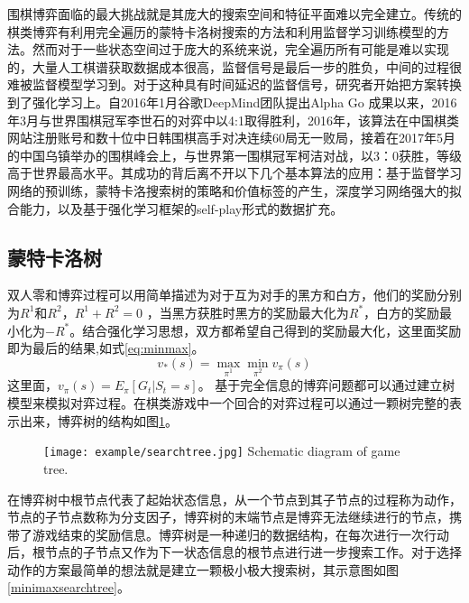 围棋博弈面临的最大挑战就是其庞大的搜索空间和特征平面难以完全建立。传统的棋类博弈有利用完全遍历的蒙特卡洛树搜索的方法和利用监督学习训练模型的方法。然而对于一些状态空间过于庞大的系统来说，完全遍历所有可能是难以实现的，大量人工棋谱获取数据成本很高，监督信号是最后一步的胜负，中间的过程很难被监督模型学习到。对于这种具有时间延迟的监督信号，研究者开始把方案转换到了强化学习上。自2016年1月谷歌DeepMind团队提出Alpha Go 成果以来，2016年3月与世界围棋冠军李世石的对弈中以4:1取得胜利，2016年，该算法在中国棋类网站注册账号和数十位中日韩围棋高手对决连续60局无一败局，接着在2017年5月的中国乌镇举办的围棋峰会上，与世界第一围棋冠军柯洁对战，以3：0获胜，等级高于世界最高水平。其成功的背后离不开以下几个基本算法的应用：基于监督学习网络的预训练，蒙特卡洛搜索树的策略和价值标签的产生，深度学习网络强大的拟合能力，以及基于强化学习框架的self-play形式的数据扩充。
\subsection{蒙特卡洛树}
双人零和博弈过程可以用简单描述为对于互为对手的黑方和白方，他们的奖励分别为$R^1$和$R^2$，$R^1+R^2=0$ ，当黑方获胜时黑方的奖励最大化为$R^*$，白方的奖励最小化为$-R^*$。结合强化学习思想，双方都希望自己得到的奖励最大化，这里面奖励即为最后的结果,如式\ref{eq:minmax}。
\begin{equation}
\label{eq:minmax}
{v_*}(s) = \mathop {\max }\limits_{{\pi ^1}} \mathop {\min }\limits_{{\pi ^2}} {v_\pi }(s)
\end{equation}
这里面，${v_\pi }(s) = {E_\pi }[{G_t}|{S_t} = s]$。
基于完全信息的博弈问题都可以通过建立树模型来模拟对弈过程。在棋类游戏中一个回合的对弈过程可以通过一颗树完整的表示出来，博弈树的结构如图\ref{fig:tree}。
\begin{figure}[htbp]
	\centering
	\texttt{[image: example/searchtree.jpg]}
	{Schematic diagram of game tree.}
	\label{fig:tree}
\end{figure}

在博弈树中根节点代表了起始状态信息，从一个节点到其子节点的过程称为动作，节点的子节点数称为分支因子，博弈树的末端节点是博弈无法继续进行的节点，携带了游戏结束的奖励信息。博弈树是一种递归的数据结构，在每次进行一次行动后，根节点的子节点又作为下一状态信息的根节点进行进一步搜索工作。对于选择动作的方案最简单的想法就是建立一颗极小极大搜索树，其示意图如图\ref{minimaxsearchtree}。


